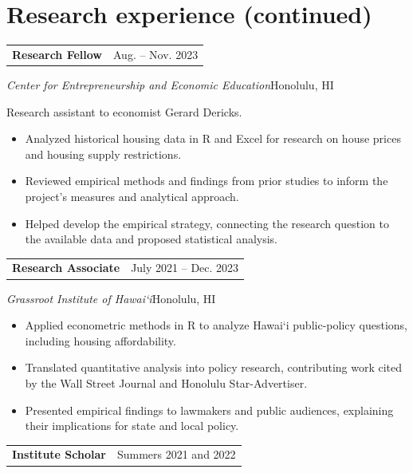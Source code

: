 \documentclass[10pt,letterpaper]{article}
\begin{document}
\section*{Research experience (continued)}
\begin{tabularx}{\linewidth}{@{}X r@{}}\textbf{Research Fellow} & {\small Aug. -- Nov. 2023}\\\end{tabularx}
\emph{Center for Entrepreneurship and Economic Education}\hfill {\small\color{muted}Honolulu, HI}\par
Research assistant to economist Gerard Dericks.\par
\begin{itemize}
\item Analyzed historical housing data in R and Excel for research on house prices and housing supply restrictions.
\item Reviewed empirical methods and findings from prior studies to inform the project's measures and analytical approach.
\item Helped develop the empirical strategy, connecting the research question to the available data and proposed statistical analysis.
\end{itemize}
\vspace{4pt}
\begin{tabularx}{\linewidth}{@{}X r@{}}\textbf{Research Associate} & {\small July 2021 -- Dec. 2023}\\\end{tabularx}
\emph{Grassroot Institute of Hawai`i}\hfill {\small\color{muted}Honolulu, HI}\par
\begin{itemize}
\item Applied econometric methods in R to analyze Hawai`i public-policy questions, including housing affordability.
\item Translated quantitative analysis into policy research, contributing work cited by the Wall Street Journal and Honolulu Star-Advertiser.
\item Presented empirical findings to lawmakers and public audiences, explaining their implications for state and local policy.
\end{itemize}
\vspace{4pt}
\begin{tabularx}{\linewidth}{@{}X r@{}}\textbf{Institute Scholar} & {\small Summers 2021 and 2022}\\\end{tabularx}
\end{document}
